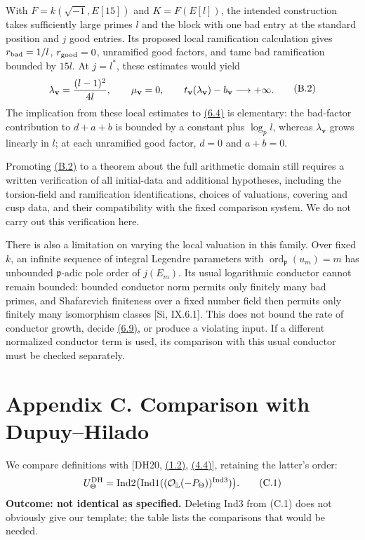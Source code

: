 \documentclass[11pt,a4paper]{amsart}
\begin{document}
With $F=k(\sqrt{-1},E[15])$ and $K=F(E[l])$, the intended construction takes sufficiently large primes $l$ and the block with one bad entry at the standard position and $j$ good entries. Its proposed local ramification calculation gives $r_{\rm bad}=1/l$, $r_{\rm good}=0$, unramified good factors, and tame bad ramification bounded by $15l$. At $j=l^*$, these estimates would yield
\begin{equation}
\begin{gathered}
\lambda_{\mathbf v}={(l-1)^2\over4l},\qquad\mu_{\mathbf v}=0,\qquad
t_{\mathbf v}(\lambda_{\mathbf v})-b_{\mathbf v}\longrightarrow+\infty.
\end{gathered}
\tag{B.2}\label{eq:B.2}
\end{equation}
The implication from these local estimates to \hyperref[eq:6.4]{(6.4)} is elementary: the bad-factor contribution to $d+a+b$ is bounded by a constant plus $\log_p l$, whereas $\lambda_{\mathbf v}$ grows linearly in $l$; at each unramified good factor, $d=0$ and $a+b=0$.


Promoting \hyperref[eq:B.2]{(B.2)} to a theorem about the full arithmetic domain still requires a written verification of all initial-data and additional hypotheses, including the torsion-field and ramification identifications, choices of valuations, covering and cusp data, and their compatibility with the fixed comparison system. We do not carry out this verification here.


There is also a limitation on varying the local valuation in this family. Over fixed $k$, an infinite sequence of integral Legendre parameters with $\operatorname{ord}_{\mathfrak p}(u_m)=m$ has unbounded $\mathfrak p$-adic pole order of $j(E_m)$. Its usual logarithmic conductor cannot remain bounded: bounded conductor norm permits only finitely many bad primes, and Shafarevich finiteness over a fixed number field then permits only finitely many isomorphism classes [Si, IX.6.1]. This does not bound the rate of conductor growth, decide \hyperref[eq:6.9]{(6.9)}, or produce a violating input. If a different normalized conductor term is used, its comparison with this usual conductor must be checked separately.


\section*{Appendix C. Comparison with Dupuy--Hilado}

We compare definitions with [DH20, \hyperref[eq:1.2]{(1.2)}, \hyperref[eq:4.4]{(4.4)}], retaining the latter's order:
\begin{equation}
\begin{gathered}
U_\Theta^{\rm DH}=\operatorname{Ind2}\bigl(\operatorname{Ind1}
((\mathcal O_{\mathbb L}(-P_\Theta))^{\operatorname{Ind3}})\bigr).
\end{gathered}
\tag{C.1}\label{eq:C.1}
\end{equation}
\textbf{Outcome: not identical as specified.} Deleting Ind3 from (C.1) does not obviously give our template; the table lists the comparisons that would be needed.
\end{document}
